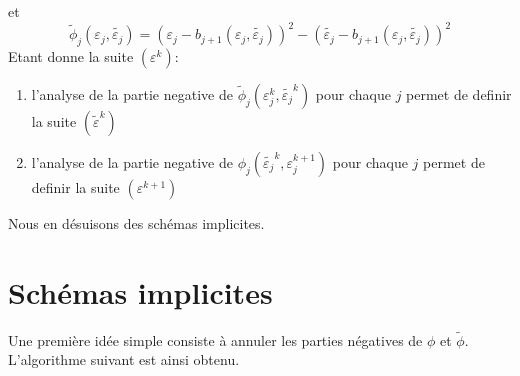 et
\begin{equation}
\tilde{\phi}_j(\varepsilon_j,\tilde{\varepsilon_j}) = (\varepsilon_j-b_{j+1}(\varepsilon_j,\tilde{\varepsilon_j}))^2 - (\tilde{\varepsilon_j}-b_{j+1}(\varepsilon_j,\tilde{\varepsilon_j}))^2
\end{equation}
Etant donne la suite $(\varepsilon^{k})$:
\begin{enumerate}
	\item l'analyse de la partie negative de $\tilde{\phi}_j(\varepsilon_j^k,\tilde{\varepsilon_j}^k)$ pour chaque $j$ permet de definir la suite $(\tilde{\varepsilon}^k)$
	\item l'analyse de la partie negative de $\phi_j(\tilde{\varepsilon_j}^k,\varepsilon_j^{k+1})$ pour chaque $j$ permet de definir la suite $(\varepsilon^{k+1})$
\end{enumerate}
Nous en désuisons des schémas implicites.

\section{Schémas implicites}
Une première idée simple consiste à annuler les parties négatives de $\phi$ et $\tilde{\phi}$. L'algorithme suivant est ainsi obtenu.
